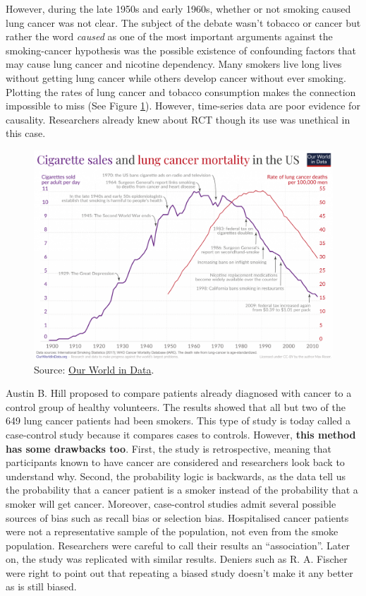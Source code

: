 \documentclass[
]{book}
\begin{document}
However, during the late 1950s and early 1960s, whether or not smoking caused lung cancer was not clear. The subject of the debate wasn't tobacco or cancer but rather the word \emph{caused} as one of the most important arguments against the smoking-cancer hypothesis was the possible existence of confounding factors that may cause lung cancer and nicotine dependency. Many smokers live long lives without getting lung cancer while others develop cancer without ever smoking. Plotting the rates of lung cancer and tobacco consumption makes the connection impossible to miss (See Figure \ref{fig:smoke-ts}). However, time-series data are poor evidence for causality. Researchers already knew about RCT though its use was unethical in this case.



\begin{figure}

{\centering \includegraphics[width=0.75\linewidth]{Figures/Smoking-and-lung-cancer-mortality-US-only} 

}

\caption{Source: \href{https://ourworldindata.org/smoking-big-problem-in-brief}{Our World in Data}.}\label{fig:smoke-ts}
\end{figure}

Austin B. Hill proposed to compare patients already diagnosed with cancer to a control group of healthy volunteers. The results showed that all but two of the 649 lung cancer patients had been smokers. This type of study is today called a case-control study because it compares cases to controls. However, \textbf{this method has some drawbacks too}. First, the study is retrospective, meaning that participants known to have cancer are considered and researchers look back to understand why. Second, the probability logic is backwards, as the data tell us the probability that a cancer patient is a smoker instead of the probability that a smoker will get cancer. Moreover, case-control studies admit several possible sources of bias such as recall bias or selection bias. Hospitalised cancer patients were not a representative sample of the population, not even from the smoke population. Researchers were careful to call their results an ``association''. Later on, the study was replicated with similar results. Deniers such as R. A. Fischer were right to point out that repeating a biased study doesn't make it any better as is still biased.
\end{document}
